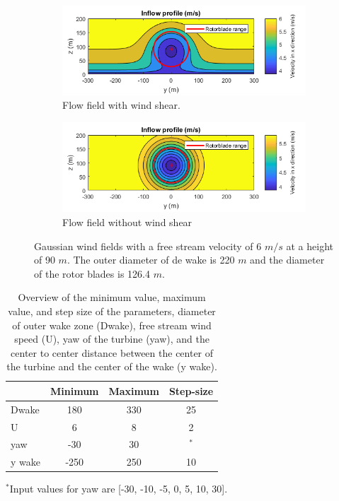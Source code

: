 \begin{figure}
	\centering
	\begin{subfigure}[b]{0.50\textwidth}
		\includegraphics[width=\linewidth]{./Figures/PlotwithshearU6D220.png} %
		\caption{Flow field with wind shear.}
		\label{fig:windsh}
	\end{subfigure}
	
	\begin{subfigure}[b]{0.50\textwidth}
		\includegraphics[width=\linewidth]{./Figures/PlotwithoutshearU6D220.png} %
		\caption{Flow field without wind shear}
		\label{fig:nowindsh}
	\end{subfigure}
	
	\caption[Two Gaussian flow fields]{Gaussian wind fields with a free stream velocity of 6 $m/s$ at a height of 90 $m$. The outer diameter of de wake is 220 $m$ and the diameter of the rotor blades is 126.4 $m$.}
	\label{fig:windshear}
\end{figure}




\begin{table}[h]
	\caption{Overview of the minimum value, maximum value, and step size of the parameters, diameter of outer wake zone (Dwake), free stream wind speed (U), yaw of the turbine (yaw), and the center to center distance between the center of the turbine and the center of the wake (y wake).}
	\centering
	\label{tab:pars}
	\begin{tabular}{lccc}
		\hline
	 	& Minimum & Maximum & Step-size \\ 
		\hline
		Dwake & 180 & 330 & 25 \\
		U & 6 & 8 & 2 \\
		yaw & -30 & 30 & $^*$ \\
		y wake & -250 & 250 & 10 \\
		\hline
	\end{tabular}
$^*$Input values for yaw are [-30, -10, -5, 0, 5, 10, 30].
\end{table}

